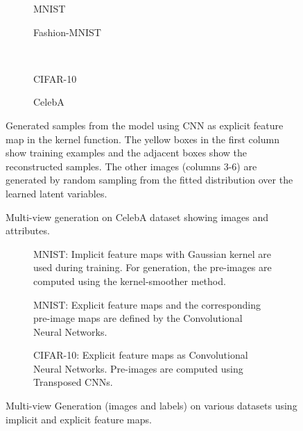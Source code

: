 \documentclass[preview,border=0.3pt]{standalone}
\begin{document}
%
\begin{figure}
	\centering
	\begin{subfigure}[b]{0.40\textwidth}
    	
        \caption{MNIST}
        \label{fig:mnist}
    \end{subfigure}
    \begin{subfigure}[b]{0.40\textwidth}
        
        \caption{Fashion-MNIST}
        \label{fig:fashion}
    \end{subfigure}
    \\
    \begin{subfigure}[b]{0.40\textwidth}
        
        \caption{CIFAR-10}
        \label{fig:cifar-10}
    \end{subfigure}
    \begin{subfigure}[b]{0.40\textwidth}
        
        \caption{CelebA}
        \label{fig:celeba}
    \end{subfigure}
    \caption{Generated samples from the model using CNN as explicit feature map in the kernel function. The yellow boxes in the first column show training examples and the adjacent boxes show the reconstructed samples. The other images (columns 3-6) are generated by random sampling from the fitted distribution over the learned latent variables.}\label{fig:gen_cov}
\end{figure}
%
%
\begin{figure}
	\centering
	
    \caption{Multi-view generation on CelebA dataset showing images and attributes.\label{fig:celeb_mul_lab}}
\end{figure}
%
%
\begin{figure}
	\centering
	\begin{subfigure}[b]{\textwidth}
		\centering
		
		\caption{MNIST: Implicit feature maps with Gaussian kernel are used during training. For generation, the pre-images are computed using the kernel-smoother method.}
		\label{fig:kernel_smooth_mnist}
	\end{subfigure}
	\begin{subfigure}[b]{\textwidth}
		\centering
		
		\caption{MNIST: Explicit feature maps and the corresponding pre-image maps are defined by the Convolutional Neural Networks.}
		\label{fig:mul_view_b}
	\end{subfigure}
	\begin{subfigure}[b]{\textwidth}
		\centering
		
		\caption{CIFAR-10: Explicit feature maps as Convolutional Neural Networks. Pre-images are computed using Transposed CNNs.}
		\label{fig:mul_view_c}
	\end{subfigure}
	\caption{Multi-view Generation (images and labels) on various datasets using implicit and explicit feature maps.}
	\label{fig:multi-view_gen}
\end{figure}
\end{document}
